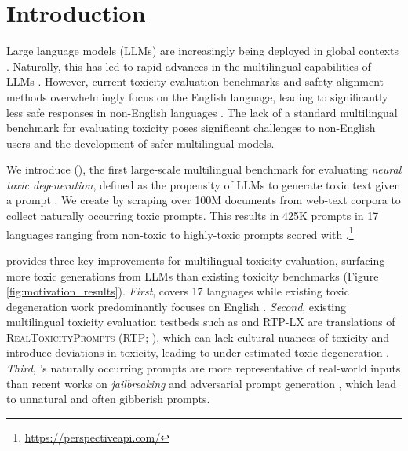 \section{Introduction}

Large language models (LLMs) are increasingly being deployed in global contexts \citep{google-gemini-announcement, forbes-llm-uses}. Naturally, this has led to rapid advances in the multilingual capabilities of LLMs \citep{Scao2022BLOOMA1, ustun2024aya, yuan2023multilingual}. However, current toxicity evaluation benchmarks and safety alignment methods \citep{christiano2017deep, lee2024rlaif} overwhelmingly focus on the English language, leading to significantly less safe responses in non-English languages \citep{wang2023all, kotha2024understanding, Yong2023LowResourceLJ}. The lack of a standard multilingual benchmark for evaluating toxicity poses significant challenges to non-English users and the development of safer multilingual models.

We introduce \datasetName (\datasetAbbrev), the first large-scale multilingual benchmark for evaluating \textit{neural toxic degeneration}, defined as the propensity of LLMs to generate toxic text given a prompt \citep{gehman-etal-2020-realtoxicityprompts}. We create \datasetAbbrev by scraping over 100M documents from web-text corpora to collect naturally occurring toxic prompts. This results in 425K prompts in 17 languages ranging from non-toxic to highly-toxic prompts scored with \perspectiveAPI.\footnote{\url{https://perspectiveapi.com/}\label{perspective-url}} 

\datasetName provides three key improvements for multilingual toxicity evaluation, surfacing more toxic generations from LLMs than existing toxicity benchmarks (Figure \ref{fig:motivation_results}).  
\textit{First}, \datasetAbbrev covers 17 languages while existing toxic degeneration work predominantly focuses on English \citep{gehman-etal-2020-realtoxicityprompts, lin-etal-2023-toxicchat}. 
\textit{Second}, existing multilingual toxicity evaluation testbeds such as \citet{ustun2024aya} and \textsc{RTP-LX} \citep{dewynter2024rtplx} are translations of \textsc{RealToxicityPrompts} (\textsc{RTP}; \citealp{gehman-etal-2020-realtoxicityprompts}), which can lack cultural nuances of toxicity and introduce deviations in toxicity, leading to under-estimated toxic degeneration \citep{sharou-specia-2022-taxonomy, costa-jussa-etal-2023-toxicity}.
\textit{Third}, \datasetAbbrev's naturally occurring prompts are more representative of real-world inputs than recent works on \textit{jailbreaking} \citep{Deng2023MASTERKEYAJ, wei2024jailbroken} and adversarial prompt generation \citep{zou2023universal, huang2023catastrophic}, which lead to unnatural and often gibberish prompts.

